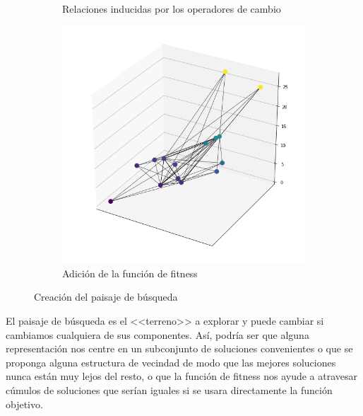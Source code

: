 \begin{figure}
\begin{subfigure}{.5\textwidth}
    \caption{Relaciones inducidas por los operadores de cambio}
\end{subfigure}
\begin{subfigure}{\textwidth}
    \centering
    \includegraphics[scale=.5]{Imagenes/search3.png}
    \caption{Adición de la función de fitness}    
\end{subfigure}
\caption{Creación del paisaje de búsqueda}
\label{fig:landscape}
\end{figure}

\medskip
El paisaje de búsqueda es el <<terreno>> a explorar y puede cambiar si cambiamos cualquiera de sus componentes.
%
Así, podría ser que alguna representación nos centre en un subconjunto de soluciones convenientes o que se proponga alguna estructura de vecindad 
de modo que las mejores soluciones nunca están muy lejos del resto, o que la función de fitness nos ayude a atravesar cúmulos de soluciones que serían iguales si se usara
directamente la función objetivo.

